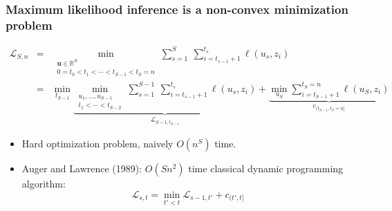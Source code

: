 \documentclass{beamer}
\newcommand{\RR}{\mathbb R}
\begin{document}
\begin{frame}
  \frametitle{Maximum likelihood inference is a non-convex minimization problem}
    
\vskip -1.4cm
\begin{eqnarray*}
  \mathcal L_{S,n} &=& \min_{\substack{
  \mathbf u\in\RR^{S}
\\
   0=t_0<t_1<\cdots<t_{S-1}<t_S=n
  }} 
    \sum_{s=1}^S\  \sum_{i=t_{s-1}+1}^{t_s} \ell( u_s,  z_i) 
\\
&=&\min_{t_{S-1}}\underbrace{
\min_{\substack{
u_1,\dots,u_{S-1}\\
t_1<\cdots<t_{S-2}
}}
  \sum_{s=1}^{S-1}\  \sum_{i=t_{s-1}+1}^{t_s} \ell( u_s,  z_i)
}_{
\mathcal L_{S-1, t_{S-1}}
} +
\underbrace{\min_{u_S} \sum_{i=t_{S-1}+1}^{t_S=n} \ell( u_S,  z_i)}_{
c_{(t_{S-1}, t_S=n]}
}
\end{eqnarray*}
\vskip -0.4cm
\begin{itemize}  
\item Hard optimization problem, naively $O(n^S)$ time.
\item Auger and Lawrence (1989): $O(Sn^2)$ time classical dynamic
  programming algorithm:
$$
\mathcal L_{s,t}=\min_{t'<t} \mathcal L_{s-1,t'} + c_{(t', t]}
$$
\end{itemize}
\end{frame} 






\end{document}
